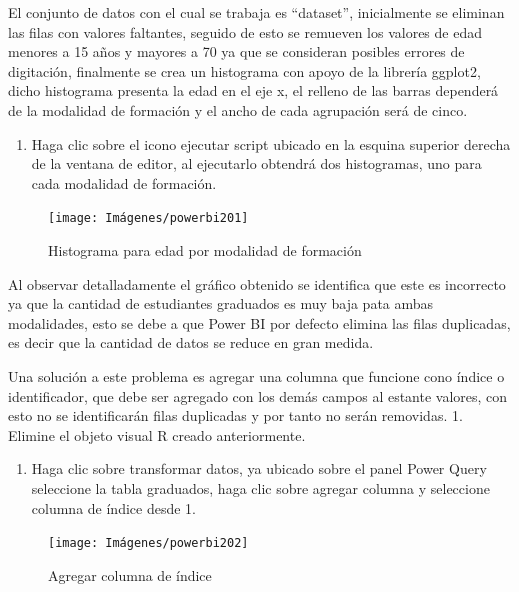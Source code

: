 \documentclass[
]{book}
\providecommand{\tightlist}{%
  \setlength{\itemsep}{0pt}\setlength{\parskip}{0pt}}
\begin{document}
El conjunto de datos con el cual se trabaja es ``dataset'', inicialmente se eliminan las filas con valores faltantes, seguido de esto se remueven los valores de edad menores a 15 años y mayores a 70 ya que se consideran posibles errores de digitación, finalmente se crea un histograma con apoyo de la librería ggplot2, dicho histograma presenta la edad en el eje x, el relleno de las barras dependerá de la modalidad de formación y el ancho de cada agrupación será de cinco.

\begin{enumerate}
\def\labelenumi{\arabic{enumi}.}
\setcounter{enumi}{5}
\tightlist
\item
  Haga clic sobre el icono ejecutar script ubicado en la esquina superior derecha de la ventana de editor, al ejecutarlo obtendrá dos histogramas, uno para cada modalidad de formación.
\end{enumerate}

\begin{figure}

{\centering \texttt{[image: Imágenes/powerbi201]} 

}

\caption{Histograma para edad por modalidad de formación}\label{fig:paso6histogramapowerbi-fig}
\end{figure}

Al observar detalladamente el gráfico obtenido se identifica que este es incorrecto ya que la cantidad de estudiantes graduados es muy baja pata ambas modalidades, esto se debe a que Power BI por defecto elimina las filas duplicadas, es decir que la cantidad de datos se reduce en gran medida.

Una solución a este problema es agregar una columna que funcione cono índice o identificador, que debe ser agregado con los demás campos al estante valores, con esto no se identificarán filas duplicadas y por tanto no serán removidas.
1. Elimine el objeto visual R creado anteriormente.

\begin{enumerate}
\def\labelenumi{\arabic{enumi}.}
\setcounter{enumi}{1}
\tightlist
\item
  Haga clic sobre transformar datos, ya ubicado sobre el panel Power Query seleccione la tabla graduados, haga clic sobre agregar columna y seleccione columna de índice desde 1.
\end{enumerate}

\begin{figure}

{\centering \texttt{[image: Imágenes/powerbi202]} 

}

\caption{Agregar columna de índice}\label{fig:correccionhistograma-fig}
\end{figure}
\end{document}
